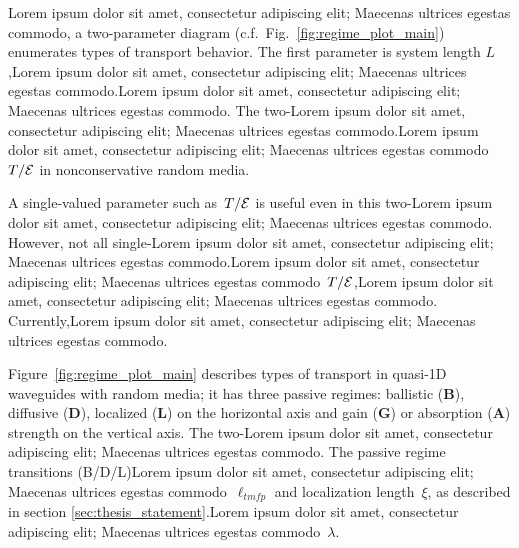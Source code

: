 Lorem ipsum dolor sit amet, consectetur adipiscing elit; Maecenas ultrices egestas commodo, a two-parameter diagram (c.f.~Fig.~\ref{fig:regime_plot_main})  %
enumerates types of transport behavior. The first parameter is system length $L$,Lorem ipsum dolor sit amet, consectetur adipiscing elit; Maecenas ultrices egestas commodo.Lorem ipsum dolor sit amet, consectetur adipiscing elit; Maecenas ultrices egestas commodo. The two-Lorem ipsum dolor sit amet, consectetur adipiscing elit; Maecenas ultrices egestas commodo.Lorem ipsum dolor sit amet, consectetur adipiscing elit; Maecenas ultrices egestas commodo$T/{\cal E}$ in nonconservative random media.

A single-valued parameter such as~$T/{\cal E}$ is useful even in this two-Lorem ipsum dolor sit amet, consectetur adipiscing elit; Maecenas ultrices egestas commodo. However, not all single-Lorem ipsum dolor sit amet, consectetur adipiscing elit; Maecenas ultrices egestas commodo.Lorem ipsum dolor sit amet, consectetur adipiscing elit; Maecenas ultrices egestas commodo~$T/{\cal E}$,Lorem ipsum dolor sit amet, consectetur adipiscing elit; Maecenas ultrices egestas commodo. Currently,Lorem ipsum dolor sit amet, consectetur adipiscing elit; Maecenas ultrices egestas commodo.

Figure~\ref{fig:regime_plot_main} describes types of transport in quasi-1D waveguides with random media; it has three passive regimes: ballistic (\textbf{B}), diffusive (\textbf{D}), localized (\textbf{L}) on the horizontal axis and gain (\textbf{G}) or absorption (\textbf{A}) strength on the vertical axis. The two-Lorem ipsum dolor sit amet, consectetur adipiscing elit; Maecenas ultrices egestas commodo. The passive regime transitions (B/D/L)Lorem ipsum dolor sit amet, consectetur adipiscing elit; Maecenas ultrices egestas commodo~$\ell_{tmfp}$ and localization length~$\xi$, as described in section \ref{sec:thesis_statement}.Lorem ipsum dolor sit amet, consectetur adipiscing elit; Maecenas ultrices egestas commodo~$\lambda$. 

